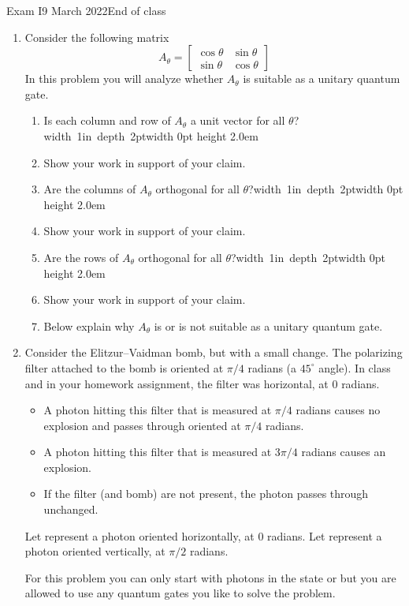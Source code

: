 \documentclass[12pt]{article}
\newcommand{\Blank}{\mbox{\vrule width 1in depth 2pt}\vrule width 0pt height 2.0em}
\begin{document}
\begin{assignment}{Exam I}{9 March 2022}{End of class}
\begin{enumerate}
\clearpage\item{}
Consider the following matrix
\[
A_{\theta}=
\begin{bmatrix}
\cos{\theta} & \sin{\theta} \\
\sin{\theta} & \cos{\theta}
\end{bmatrix}
\]
In this problem you will analyze whether $A_{\theta}$ is suitable as a unitary quantum
gate.
\begin{enumerate}
 \item{} Is each column and row of $A_\theta$ a unit vector for all
$\theta$?\Blank{}
 \item{} Show your work in support of your claim.
\LeaveSpace{2cm}
 \item{} Are the columns of $A_\theta$ orthogonal for all $\theta$?\Blank{}
 \item{} Show your work in support of your claim.
\LeaveSpace{2cm}
 \item{} Are the rows of $A_\theta$ orthogonal for all $\theta$?\Blank{}
 \item{} Show your work in support of your claim.
\LeaveSpace{2cm}
  \item{} Below explain why $A_\theta$ is or is not suitable as a
unitary quantum gate.
\LeaveSpace{2cm}
\end{enumerate}
\clearpage\item{}
Consider the Elitzur--Vaidman bomb, but with a small change.  The
polarizing filter attached to the bomb is
oriented at $\pi/4$ radians (a $45^{\circ}$ angle).  In class and in your homework assignment,
the filter was horizontal, at $0$ radians.

\begin{itemize}
\item
A photon hitting this filter that is measured at $\pi/4$ radians causes
no explosion and passes through oriented at $\pi/4$ radians.
\item
A photon hitting this filter that is measured at $3\pi/4$ radians causes
an explosion.
\item If the filter (and bomb) are not present, the photon passes through
unchanged.
\end{itemize}
Let  represent a photon oriented horizontally, at $0$ radians.
Let  represent a photon oriented vertically, at $\pi/2$ radians.

For this problem you can only start with photons in the state  or
 but you are allowed to use any quantum gates you like to solve
the problem.


\end{enumerate}
\end{assignment}
\end{document}

